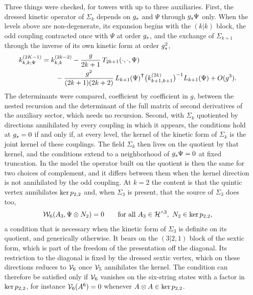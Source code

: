 Three things were checked, for towers with up to three auxiliaries.
First, the dressed kinetic operator of $\Sigma_k$ depends on $g_s$ and $\Psi$ through $g_s \Psi$ only.
When the levels above are non-degenerate, its expansion begins with the $(k \vert k)$ block, the odd coupling contracted once with $\Psi$ at order $g_s$, and the exchange of $\Sigma_{k+1}$ through the inverse of its own kinetic form at order $g_s^2$,
\begin{align}
  \label{fdm:eq:nested:expansion}
  \kin{k}{\Psi}{2 K - 1}
    &
    = \kin{k}{}{2 k - 2}
      - \frac{g}{2 k + 1} \, T_{2k+1}(\cdot, \cdot, \Psi)
  \nonumber
  \\
    &
    \qquad
      - \frac{g^2}{(2 k + 1)(2 k + 2)} \, L_{k + 1}(\Psi)^{\mathsf T} \big( \kin{k + 1}{}{2 k} \big)^{-1} L_{k + 1}(\Psi)
      + O(g^3).
\end{align}
The determinants were compared, coefficient by coefficient in $g$, between the nested recursion and the determinant of the full matrix of second derivatives of the auxiliary sector, which needs no recursion.
Second, with $\Sigma_k$ quotiented by directions annihilated by every coupling in which it appears, the conditions hold at $g_s = 0$ if and only if, at every level, the kernel of the kinetic form of $\Sigma_k$ is the joint kernel of these couplings.
The field $\Sigma_k$ then lives on the quotient by that kernel, and the conditions extend to a neighborhood of $g_s \Psi = 0$ at fixed truncation.
In the model the operator built on the quotient is then the same for two choices of complement, and it differs between them when the kernel direction is not annihilated by the odd coupling.
At $k = 2$ the content is that the quintic vertex annihilates $\ker p_{2,2}$ and, when $\Sigma_3$ is present, that the source of $\Sigma_3$ does too,
\begin{equation}
  \label{fdm:eq:fm:source-kernel}
  \mathcal{W}_{6}(A_3, \Psi \otimes N_2)
    = 0
  \qquad
  \text{for all } A_3 \in \mathcal{H}^{\wedge 3}, \ N_2 \in \ker p_{2,2},
\end{equation}
a condition that is necessary when the kinetic form of $\Sigma_3$ is definite on its quotient, and generically otherwise.
It bears on the $(3 \vert 2, 1)$ block of the sextic form, which is part of the freedom of the presentation off the diagonal.
Its restriction to the diagonal is fixed by the dressed sextic vertex, which on these directions reduces to $\mathcal{V}_{6}$ once $\mathcal{V}_{5}$ annihilates the kernel.
The condition can therefore be satisfied only if $\mathcal{V}_{6}$ vanishes on the six-string states with a factor in $\ker p_{2,2}$, for instance $\mathcal{V}_{6}(A^6) = 0$ whenever $A \otimes A \in \ker p_{2,2}$.
